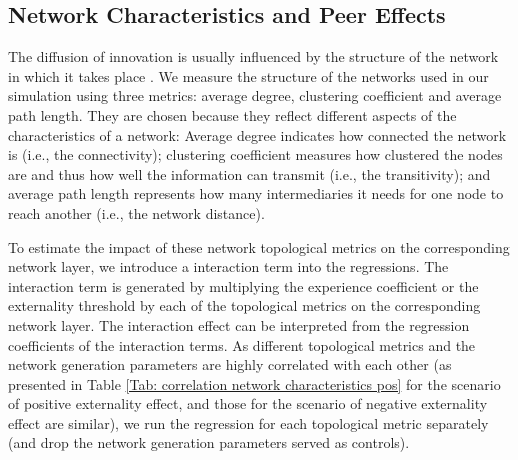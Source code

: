 \documentclass{bmcart}
\renewcommand{\tablename}{Table }
\begin{document}
\subsection*{Network Characteristics and Peer Effects}
\label{Sec: network characteristics and peer effects}
The diffusion of innovation is usually influenced by the structure of the network in which it takes place \cite{Peres2014}. We measure the structure of the networks used in our simulation using three metrics: average degree, clustering coefficient and average path length. They are chosen because they reflect different aspects of the characteristics of a network: Average degree indicates how connected the network is (i.e., the connectivity); clustering coefficient measures how clustered the nodes are and thus how well the information can transmit (i.e., the transitivity); and average path length represents how many intermediaries it needs for one node to reach another (i.e., the network distance).

To estimate the impact of these network topological metrics on the corresponding network layer, we introduce a interaction term into the regressions. The interaction term is generated by multiplying the experience coefficient or the externality threshold by each of the topological metrics on the corresponding network layer. The interaction effect can be interpreted from the regression coefficients of the interaction terms. As different topological metrics and the network generation parameters are highly correlated with each other (as presented in \tablename \ref{Tab: correlation network characteristics pos} for the scenario of positive externality effect, and those for the scenario of negative externality effect are similar), we run the regression for each topological metric separately (and drop the network generation parameters served as controls). 
\end{document}
